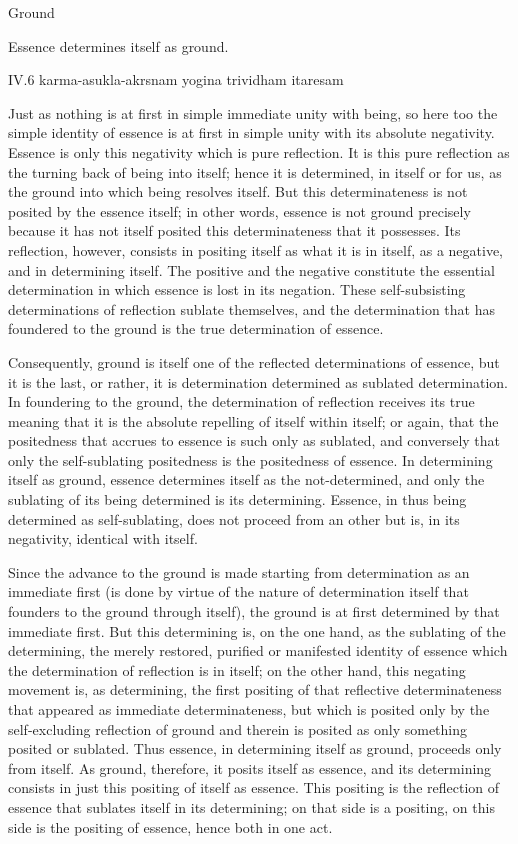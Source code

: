 Ground

Essence determines itself as ground.

IV.6
karma-asukla-akrsnam yogina trividham itaresam

Just as nothing is at first
in simple immediate unity with being,
so here too the simple identity of essence is
at first in simple unity with its absolute negativity.
Essence is only this negativity which is pure reflection.
It is this pure reflection as
the turning back of being into itself;
hence it is determined, in itself or for us,
as the ground into which being resolves itself.
But this determinateness is not posited by the essence itself;
in other words, essence is not ground precisely because
it has not itself posited this determinateness that it possesses.
Its reflection, however, consists in positing itself as
what it is in itself, as a negative, and in determining itself.
The positive and the negative constitute the essential determination
in which essence is lost in its negation.
These self-subsisting determinations of reflection sublate themselves,
and the determination that has foundered to the ground is
the true determination of essence.

Consequently, ground is itself one of
the reflected determinations of essence,
but it is the last, or rather,
it is determination determined as sublated determination.
In foundering to the ground, the determination of reflection
receives its true meaning that it is the absolute
repelling of itself within itself;
or again, that the positedness that accrues to essence is
such only as sublated,
and conversely that only the self-sublating positedness is
the positedness of essence.
In determining itself as ground,
essence determines itself as the not-determined,
and only the sublating of its being determined is its determining.
Essence, in thus being determined as self-sublating,
does not proceed from an other but is,
in its negativity, identical with itself.

Since the advance to the ground is made starting
from determination as an immediate first
(is done by virtue of the nature of determination itself
that founders to the ground through itself),
the ground is at first determined by that immediate first.
But this determining is, on the one hand,
as the sublating of the determining,
the merely restored, purified or manifested identity of essence
which the determination of reflection is in itself;
on the other hand, this negating movement is, as determining,
the first positing of that reflective determinateness
that appeared as immediate determinateness,
but which is posited only by the self-excluding reflection of ground
and therein is posited as only something posited or sublated.
Thus essence, in determining itself as ground, proceeds only from itself.
As ground, therefore, it posits itself as essence,
and its determining consists in just this positing of itself as essence.
This positing is the reflection of essence
that sublates itself in its determining;
on that side is a positing, on this side is the positing of essence,
hence both in one act.

